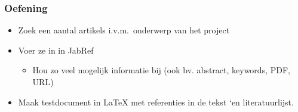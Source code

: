 \documentclass{beamer}
\begin{document}
\begin{frame}
  \frametitle{Oefening}

  \begin{itemize}
    \item Zoek een aantal artikels i.v.m.~onderwerp van het project
    \item Voer ze in in JabRef
      \begin{itemize}
        \item Hou zo veel mogelijk informatie bij (ook bv. abstract, keywords, PDF, URL)
      \end{itemize}
    \item Maak testdocument in {\LaTeX} met referenties in de tekst `en literatuurlijst.
  \end{itemize}
\end{frame}
\end{document}
